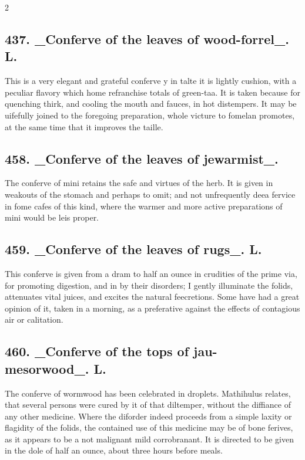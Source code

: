 \documentclass[10pt]{article}
\begin{document}
\begin{multicols}{2}
\subsection*{437. \_Conferve of the leaves of wood-forrel\_. L.}
This is a very elegant and grateful conferve y in talte it is lightly cushion, with a peculiar flavory which home refranchise totals of green-taa. It is taken because for quenching thirk, and cooling the mouth and fauces, in hot distempers. It may be uifefully joined to the foregoing preparation, whole victure to fomelan promotes, at the same time that it improves the taille.

\subsection*{458. \_Conferve of the leaves of jewarmist\_.}
The conferve of mini retains the safe and virtues of the herb. It is given in weakouts of the stomach and perhaps to omit; and not unfrequently deea fervice in fome cafes of this kind, where the warmer and more active preparations of mini would be leis proper.

\subsection*{459. \_Conferve of the leaves of rugs\_. L.}
This conferve is given from a dram to half an ounce in crudities of the prime via, for promoting digestion, and in by their disorders; I gently illuminate the folids, attenuates vital juices, and excites the natural feecretions. Some have had a great opinion of it, taken in a morning, as a preferative against the effects of contagious air or calitation.

\subsection*{460. \_Conferve of the tops of jau-mesorwood\_. L.}
The conferve of wormwood has been celebrated in droplets. Mathihulus relates, that several persons were cured by it of that diltemper, without the diffiance of any other medicine. Where the diforder indeed proceeds from a simple laxity or flagidity of the folids, the contained use of this medicine may be of bone ferives, as it appears to be a not malignant mild corrobranant. It is directed to be given in the dole of half an ounce, about three hours before meals.


\end{multicols}
\end{document}
